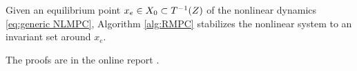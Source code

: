 
\begin{theorem}[Stability]
	\label{thm:stability}
Given an equilibrium point $x_e \in X_0 \subset T^{-1}(Z)$ of the nonlinear dynamics \eqref{eq:generic NLMPC}, Algorithm \ref{alg:RMPC} stabilizes the nonlinear system to an invariant set around $x_e$.
\end{theorem}
The proofs are in the online report \cite{PantAM16_RMPC}.
